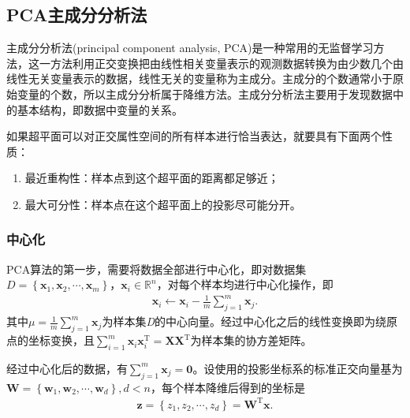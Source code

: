 \documentclass{hitreport}
\begin{document}
\subsection{PCA主成分分析法}

主成分分析法(principal component analysis, PCA)是一种常用的无监督学习方法，这一方法利用正交变换把由线性相关变量表示的观测数据转换为由少数几个由线性无关变量表示的数据，线性无关的变量称为主成分。主成分的个数通常小于原始变量的个数，所以主成分分析属于降维方法。主成分分析法主要用于发现数据中的基本结构，即数据中变量的关系。

如果超平面可以对正交属性空间的所有样本进行恰当表达，就要具有下面两个性质：
\begin{enumerate}
\item 最近重构性：样本点到这个超平面的距离都足够近；
\item 最大可分性：样本点在这个超平面上的投影尽可能分开。
\end{enumerate}

\subsubsection{中心化}

PCA算法的第一步，需要将数据全部进行中心化，即对数据集$D = \left\{\boldsymbol{x}_1, \boldsymbol{x}_2, \cdots, \boldsymbol{x}_m\right\}$，$\boldsymbol{x}_i\in \mathbb{R}^n$，对每个样本均进行中心化操作，即
\begin{align}
\boldsymbol{x}_i\leftarrow \boldsymbol{x}_i - \frac{1}{m}\sum_{j=1}^{m}\boldsymbol{x}_j.
\end{align}
其中$\mu = \frac{1}{m}\sum_{j=1}^{m}\boldsymbol{x}_j$为样本集\textit{D}的中心向量。经过中心化之后的线性变换即为绕原点的坐标变换，且$\sum_{i=1}^{m}\boldsymbol{x}_i\boldsymbol{x}_i^\text{T} = \boldsymbol{X}\boldsymbol{X}^\text{T}$为样本集的协方差矩阵。

经过中心化后的数据，有$\sum_{j=1}^{m}\boldsymbol{x}_j = \boldsymbol{0}$。设使用的投影坐标系的标准正交向量基为$\boldsymbol{W} = \left\{\boldsymbol{w}_1,\boldsymbol{w}_2,\cdots,\boldsymbol{w}_d\right\}, d<n$，每个样本降维后得到的坐标是
\begin{align}\label{equ:zwx}
\boldsymbol{z} = \left\{z_1,z_2,\cdots,z_d\right\} = \boldsymbol{W}^{\text{T}}\boldsymbol{x}.
\end{align}
\end{document}
